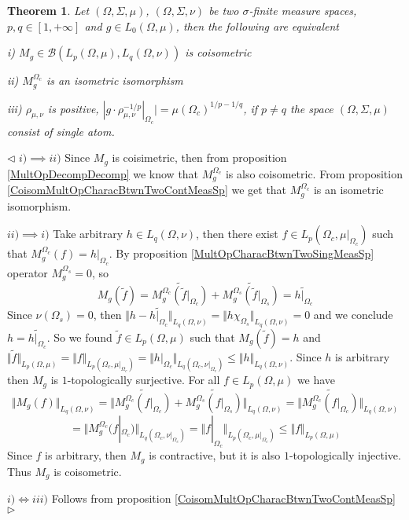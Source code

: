 \documentclass[12pt]{article}
\newtheorem{theorem}{Theorem}[subsection]
\newenvironment{proof}{\par $\triangleleft$}{$\triangleright$}
\begin{document}
\begin{theorem}\label{CoisomMultOpCharacBtwnTwoMeasSp} Let $(\Omega,\Sigma,\mu)$, $(\Omega,\Sigma,\nu)$ be two $\sigma$-finite measure spaces, $p,q\in[1,+\infty]$ and $g\in L_0(\Omega,\mu)$, then the following are equivalent

i) $M_g\in\mathcal{B}(L_p(\Omega,\mu), L_q(\Omega,\nu))$ is coisometric

ii) $M_g^{\Omega_c}$ is an isometric isomorphism

iii) $\rho_{\mu,\nu}$ is positive, $|g\cdot\rho_{\mu,\nu}^{-1/p}|_{\Omega_c}|=\mu(\Omega_c)^{1/p-1/q}$, if $p\neq q$ the space $(\Omega,\Sigma,\mu)$ consist of single atom.
\end{theorem}
\begin{proof} $i)\implies ii)$ Since $M_g$ is coisimetric, then from proposition \ref{MultOpDecompDecomp} we know that $M_g^{\Omega_c}$ is also coisometric. From proposition \ref{CoisomMultOpCharacBtwnTwoContMeasSp} we get that $M_g^{\Omega_c}$ is an isometric isomorphism.

$ii)\implies i)$ Take arbitrary $h\in L_q(\Omega,\nu)$, then there exist $f\in L_p(\Omega_c,\mu|_{\Omega_c})$ such that $M_g^{\Omega_c}(f)=h|_{\Omega_c}$. By proposition \ref{MultOpCharacBtwnTwoSingMeasSp} operator $M_g^{\Omega_s}=0$, so
$$
M_g(\widetilde{f})
=\widetilde{M_g^{\Omega_c}(\widetilde{f}|_{\Omega_c})}+\widetilde{M_g^{\Omega_s}(\widetilde{f}|_{\Omega_s})}
=\widetilde{h|_{\Omega_c}}
$$
Since $\nu(\Omega_s)=0$, then $\Vert h-\widetilde{h|_{\Omega_c}}\Vert_{L_q(\Omega,\nu)}=\Vert h\chi_{\Omega_s}\Vert_{L_q(\Omega,\nu)}=0$ and we conclude $h=\widetilde{h|_{\Omega_c}}$. So we found $\widetilde{f}\in L_p(\Omega,\mu)$ such that $M_g(\widetilde{f})=h$ and $\Vert \widetilde{f}\Vert_{L_p(\Omega,\mu)}=\Vert f\Vert_{L_p(\Omega_c,\mu|_{\Omega_c})}=\Vert h|_{\Omega_c}\Vert_{L_q(\Omega_c,\nu|_{\Omega_c})}\leq\Vert h\Vert_{L_q(\Omega,\nu)}$. Since $h$ is arbitrary then $M_g$ is $1$-topologically surjective. For all $f\in L_p(\Omega,\mu)$ we have
$$
\Vert M_g(f)\Vert_{L_q(\Omega,\nu)}
=\Vert\widetilde{M_g^{\Omega_c}(f|_{\Omega_c})}+\widetilde{M_g^{\Omega_s}(f|_{\Omega_s})}\Vert_{L_q(\Omega,\nu)}
=\Vert\widetilde{M_g^{\Omega_c}(f|_{\Omega_c})}\Vert_{L_q(\Omega,\nu)}
$$
$$
=\Vert M_g^{\Omega_c}(f|_{\Omega_c})\Vert_{L_q(\Omega_c,\nu|_{\Omega_c})}
=\Vert f|_{\Omega_c}\Vert_{L_p(\Omega_c,\mu|_{\Omega_c})}
\leq\Vert f \Vert_{L_p(\Omega,\mu)}
$$
Since $f$ is arbitrary, then $M_g$ is contractive, but it is also $1$-topologically injective. Thus $M_g$ is coisometric.

$i)\Longleftrightarrow iii)$ Follows from proposition \ref{CoisomMultOpCharacBtwnTwoContMeasSp}
\end{proof}
\end{document}
